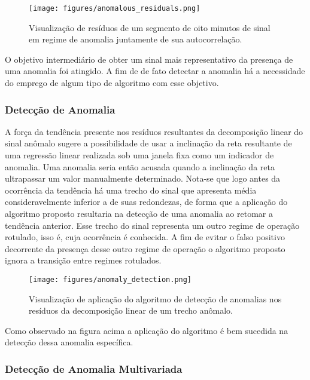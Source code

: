\begin{figure}[H]
    \centering
    \texttt{[image: figures/anomalous\_residuals.png]}
    \caption{Visualização de resíduos de um segmento de oito minutos de sinal
    em regime de anomalia juntamente de sua autocorrelação.}
    \label{fig:anomalous_residue}
\end{figure}

O objetivo intermediário de obter um sinal mais representativo da presença de
uma anomalia foi atingido. A fim de de fato detectar a anomalia há a
necessidade do emprego de algum tipo de algoritmo com esse objetivo.

\subsubsection{Detecção de Anomalia}\label{ssec:algorithm}

A força da tendência presente nos resíduos resultantes da decomposição linear
do sinal anômalo sugere a possibilidade de usar a inclinação da reta resultante
de uma regressão linear realizada sob uma janela fixa como um indicador de
anomalia. Uma anomalia seria então acusada quando a inclinação da reta
ultrapassar um valor manualmente determinado. Nota-se que logo antes da
ocorrência da tendência há uma trecho do sinal que apresenta média
consideravelmente inferior a de suas redondezas, de forma que a aplicação do
algoritmo proposto resultaria na detecção de uma anomalia ao retomar a
tendência anterior. Esse trecho do sinal representa um outro regime de operação
rotulado, isso é, cuja ocorrência é conhecida. A fim de evitar o falso positivo
decorrente da presença desse outro regime de operação o algoritmo proposto
ignora a transição entre regimes rotulados.

\begin{figure}[H]
    \centering
    \texttt{[image: figures/anomaly\_detection.png]}
    \caption{Visualização de aplicação do algoritmo de detecção de anomalias
    nos resíduos da decomposição linear de um trecho anômalo.}
    \label{fig:normal_residue}
\end{figure}

Como observado na figura acima a aplicação do algoritmo é bem sucedida na
detecção dessa anomalia específica.

\subsubsection{Detecção de Anomalia Multivariada}

